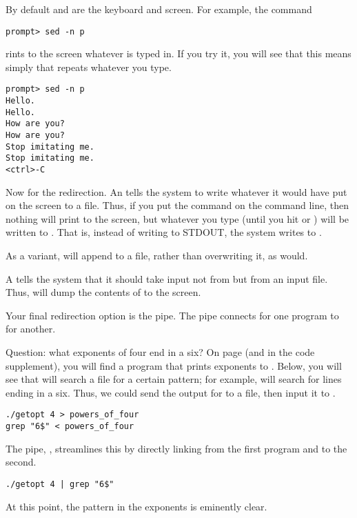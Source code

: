 By default  and  are the keyboard and screen. 
For example, the command
\begin{lstlisting}
prompt> sed -n p
\end{lstlisting}
rints to the screen whatever is typed in. If you
try it, you will see that this means simply that  repeats
whatever you type.
\begin{lstlisting}
prompt> sed -n p
Hello.
Hello.
How are you?
How are you?
Stop imitating me.
Stop imitating me.
<ctrl>-C
\end{lstlisting}
Now for the redirection. An \cind{>} tells the system to write whatever
it would have put on the screen to a file. Thus, if you put the
command  on the command line, then nothing will
print to the screen, but whatever you type (until you hit 
or ) will be written to . That is, instead of
writing to STDOUT, the system writes to .

As a variant,  will append to a file, rather than
overwriting it, as  would.

A \cind{<} tells the system that it should take input not from 
but from an input file. Thus,  will dump the
contents of  to the screen. 


Your final redirection option is the pipe. The pipe connects 
for one program to  for another. 

Question: what exponents of four end in a six?  On page \pageref{getopt}
(and in the code supplement), you will find a program that prints
exponents to . Below, you will see that  will search
a file for a certain pattern; for example,  will
search  for lines ending in a six. Thus, we could send the
output for  to a file, then input it to .
\begin{lstlisting}
./getopt 4 > powers_of_four
grep "6$" < powers_of_four
\end{lstlisting}
The pipe, \ci{|}, streamlines this by directly linking  from
the first program and  to the second.
\begin{lstlisting}
./getopt 4 | grep "6$" 
\end{lstlisting}
At this point, the pattern in the exponents is eminently clear.


